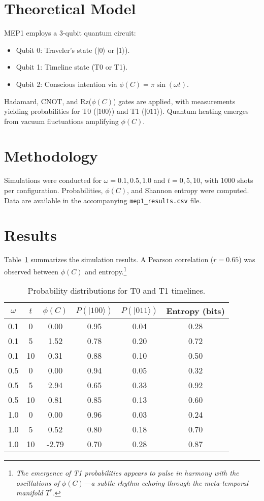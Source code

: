 \section{Theoretical Model}
MEP1 employs a 3-qubit quantum circuit:
\begin{itemize}
    \item Qubit 0: Traveler's state ($|0\rangle$ or $|1\rangle$).
    \item Qubit 1: Timeline state (T0 or T1).
    \item Qubit 2: Conscious intention via $\phi(C) = \pi \sin(\omega t)$.
\end{itemize}
Hadamard, CNOT, and Rz($\phi(C)$) gates are applied, with measurements yielding probabilities for T0 ($|100\rangle$) and T1 ($|011\rangle$). Quantum heating emerges from vacuum fluctuations amplifying $\phi(C)$.

\section{Methodology}
Simulations were conducted for $\omega = 0.1, 0.5, 1.0$ and $t = 0, 5, 10$, with 1000 shots per configuration. Probabilities, $\phi(C)$, and Shannon entropy were computed. Data are available in the accompanying \texttt{mep1\_results.csv} file.

\section{Results}
Table~\ref{tab:results} summarizes the simulation results. A Pearson correlation ($r = 0.65$) was observed between $\phi(C)$ and entropy.\footnote{\emph{The emergence of T1 probabilities appears to pulse in harmony with the oscillations of $\phi(C)$---a subtle rhythm echoing through the meta-temporal manifold $T^*$.}}

\begin{table}[h]
\centering
\begin{tabular}{|c|c|c|c|c|c|}
\hline
$\omega$ & $t$ & $\phi(C)$ & $P(|100\rangle)$ & $P(|011\rangle)$ & Entropy (bits) \\
\hline
0.1 & 0 & 0.00 & 0.95 & 0.04 & 0.28 \\
0.1 & 5 & 1.52 & 0.78 & 0.20 & 0.72 \\
0.1 & 10 & 0.31 & 0.88 & 0.10 & 0.50 \\
0.5 & 0 & 0.00 & 0.94 & 0.05 & 0.32 \\
0.5 & 5 & 2.94 & 0.65 & 0.33 & 0.92 \\
0.5 & 10 & 0.81 & 0.85 & 0.13 & 0.60 \\
1.0 & 0 & 0.00 & 0.96 & 0.03 & 0.24 \\
1.0 & 5 & 0.52 & 0.80 & 0.18 & 0.70 \\
1.0 & 10 & -2.79 & 0.70 & 0.28 & 0.87 \\
\hline
\end{tabular}
\caption{Probability distributions for T0 and T1 timelines.}
\label{tab:results}
\end{table}

